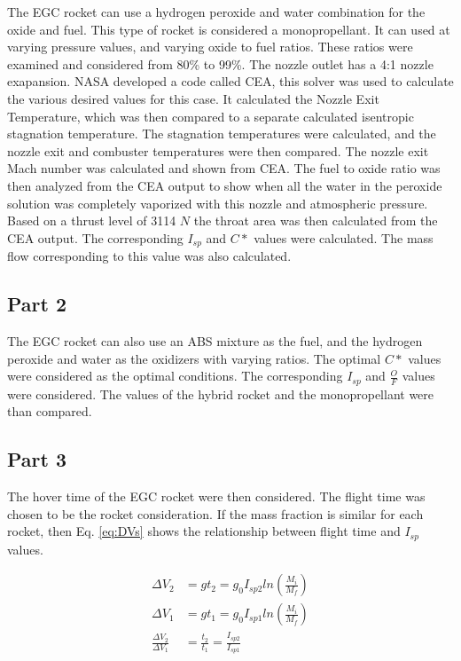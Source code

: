 \documentclass[cleanfoot,cleanhead,onecolumn,12pt,notitlepage]{asme2e}
\begin{document}
The EGC rocket can use a hydrogen peroxide and water combination for the oxide and fuel.  This type of rocket is considered a monopropellant.  It can used at varying pressure values, and varying oxide to fuel ratios.  These ratios were examined and considered from 80\% to 99\%.  The nozzle outlet has a 4:1 nozzle exapansion.  NASA developed a code called CEA, this solver was used to calculate the various desired values for this case.  It calculated the Nozzle Exit Temperature, which was then compared to a separate calculated isentropic stagnation temperature.  The stagnation temperatures were calculated, and the nozzle exit and combuster temperatures were then compared.  The nozzle exit Mach number was calculated and shown from CEA.  The fuel to oxide ratio was then analyzed from the CEA output to show when all the water in the peroxide solution was completely vaporized with this nozzle and atmospheric pressure.  Based on a thrust level of 3114 $N$ the throat area was then calculated from the CEA output.  The corresponding $I_{sp}$ and $C*$ values were calculated.  The mass flow corresponding to this value was also calculated.

\subsection{Part 2}
The EGC rocket can also use an ABS mixture as the fuel, and the hydrogen peroxide and water as the oxidizers with varying ratios.  The optimal $C*$ values were considered as the optimal conditions.  The corresponding $I_{sp}$ and $\frac{O}{F}$ values were considered. The values of the hybrid rocket and the monopropellant were than compared.  

\subsection{Part 3}
The hover time of the EGC rocket were then considered.  The flight time was chosen to be the rocket consideration.  If the mass fraction is similar for each rocket, then Eq. \ref{eq:DVs} shows the relationship between flight time and $I_{sp}$ values.

\begin{equation}
    \begin{aligned}
        \Delta V_2 &= gt_2 = g_0 I_{sp2} ln(\frac{M_i}{M_f}) \\
        \Delta V_1 &= gt_1 = g_0 I_{sp1} ln(\frac{M_i}{M_f}) \\
        \frac{\Delta V_2 }{\Delta V_1} &= \frac{t_2}{t_1} = \frac{I_{sp2}}{I_{sp1}}
        \label{eq:DVs}
    \end{aligned}
\end{equation}
\end{document}
